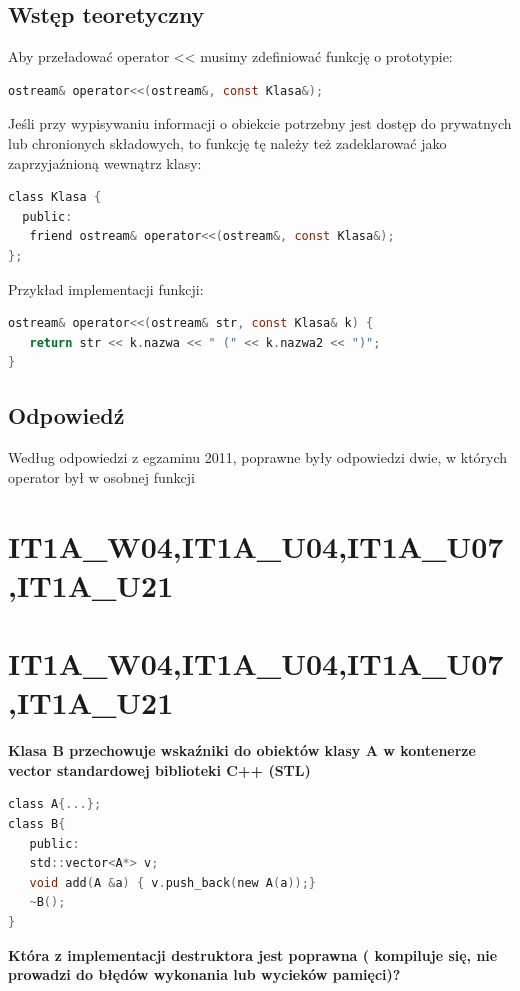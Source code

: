 \subsection{Wstęp teoretyczny}
Aby przeładować operator << musimy zdefiniować funkcję o prototypie: 
\begin{lstlisting}[language=c]
ostream& operator<<(ostream&, const Klasa&);
\end{lstlisting}
Jeśli przy wypisywaniu informacji o obiekcie potrzebny jest dostęp do prywatnych lub chronionych składowych, to funkcję tę należy też zadeklarować jako zaprzyjaźnioną wewnątrz klasy:
\begin{lstlisting}[language=c]
class Klasa {
  public:
   friend ostream& operator<<(ostream&, const Klasa&);
};
\end{lstlisting}
Przykład implementacji funkcji:
\begin{lstlisting}[language=c]
ostream& operator<<(ostream& str, const Klasa& k) {
   return str << k.nazwa << " (" << k.nazwa2 << ")";
}
\end{lstlisting}
\subsection{Odpowiedź}
Według odpowiedzi z egzaminu 2011, poprawne były odpowiedzi dwie, w których operator był w osobnej funkcji

\section{IT1A\_W04,IT1A\_U04,IT1A\_U07,IT1A\_U21} 

\section{IT1A\_W04,IT1A\_U04,IT1A\_U07,IT1A\_U21} 
\textbf{Klasa B przechowuje wskaźniki do obiektów klasy A w kontenerze vector standardowej biblioteki C++ (STL)}
\begin{lstlisting}[language=c]
class A{...};
class B{
   public:
   std::vector<A*> v;
   void add(A &a) { v.push_back(new A(a));}
   ~B();
}
\end{lstlisting}
\textbf{Która z implementacji destruktora jest poprawna ( kompiluje się, nie prowadzi do błędów wykonania lub wycieków pamięci)?}

